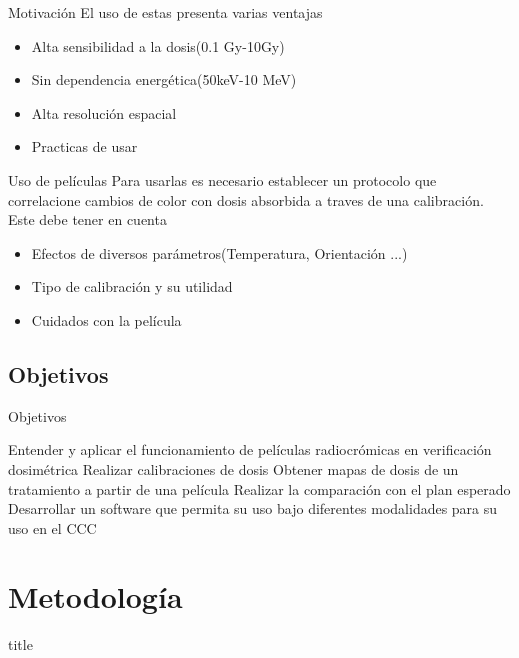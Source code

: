 \documentclass[12pt]{beamer}
\begin{document}
\begin{frame}{Motivación}
	El uso de estas presenta varias ventajas
	\begin{itemize}
		\item Alta sensibilidad a la dosis(0.1 Gy-10Gy)
		\item Sin dependencia energética(50keV-10 MeV)
		\item Alta resolución espacial
		\item Practicas de usar
	\end{itemize}
\end{frame}

\begin{frame}{Uso de películas}
Para usarlas es necesario establecer un protocolo que correlacione cambios de color con dosis absorbida a traves de una calibración. Este debe tener en cuenta
\begin{itemize}
	\item Efectos de diversos parámetros(Temperatura, Orientación ...)
	\item Tipo de calibración y su utilidad
	\item Cuidados con la película
\end{itemize}
\end{frame}

\subsection{Objetivos}
\begin{frame}{Objetivos}
	\begin{outline}
		\1 Entender y aplicar el funcionamiento de películas radiocrómicas en verificación dosimétrica
		\2 Realizar calibraciones de dosis
		\2 Obtener mapas de dosis de un tratamiento a partir de una película
		\2 Realizar la comparación con el plan esperado
		\1 Desarrollar un software que permita su uso bajo diferentes modalidades para su uso en el CCC
	\end{outline}
\end{frame}

\section{Metodología}
\begin{frame}
	\vfill
	\centering
	\begin{beamercolorbox}[sep=8pt,center,shadow=true,rounded=true]{title}
		\insertsectionhead\par%
	\end{beamercolorbox}
	\vfill
\end{frame}
\end{document}
